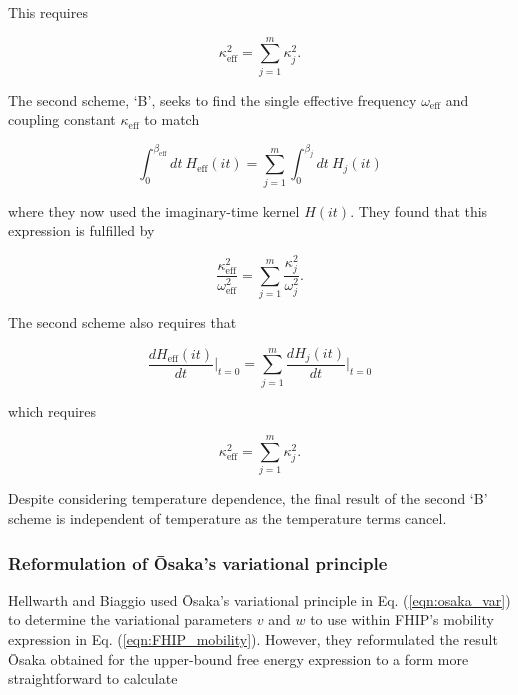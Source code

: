This requires

\begin{equation}
    \kappa_{\text{eff}}^2 = \sum_{j=1}^m \kappa_j^2.
\end{equation}

The second scheme, `B', seeks to find the single effective frequency $\omega_{\text{eff}}$ and coupling constant $\kappa_{\text{eff}}$ to match

\begin{equation}
    \int^{\beta_{\text{eff}}}_0 dt\ H_{\text{eff}}(it) = \sum_{j = 1}^m \int^{\beta_j}_0 dt\ H_j(it)
\end{equation}

where they now used the imaginary-time kernel $H(it)$. They found that this expression is fulfilled by

\begin{equation}
    \frac{\kappa_{\text{eff}}^2}{\omega_{\text{eff}}^2} = \sum_{j = 1}^m \frac{\kappa_{j}^2}{\omega_{j}^2}.
\end{equation}

The second scheme also requires that

\begin{equation}
    \frac{dH_{\text{eff}}(it)}{dt} \biggr\rvert_{t=0} = \sum_{j=1}^m \frac{dH_{j}(it)}{dt} \biggr\rvert_{t=0}
\end{equation}

which requires

\begin{equation} \label{eqn:hellwarth_scheme_f}
    \kappa_{\text{eff}}^2 = \sum_{j=1}^m \kappa_j^2.
\end{equation}

Despite considering temperature dependence, the final result of the second `B' scheme is independent of temperature as the temperature terms cancel.

\subsubsection{Reformulation of \=Osaka's variational principle}
\label{subsubsec:2-3-3-6}

Hellwarth and Biaggio used \=Osaka's variational principle in Eq. (\ref{eqn:osaka_var}) to determine the variational parameters $v$ and $w$ to use within FHIP's mobility expression in Eq. (\ref{eqn:FHIP_mobility}). However, they reformulated the result \=Osaka obtained for the upper-bound free energy expression to a form more straightforward to calculate


